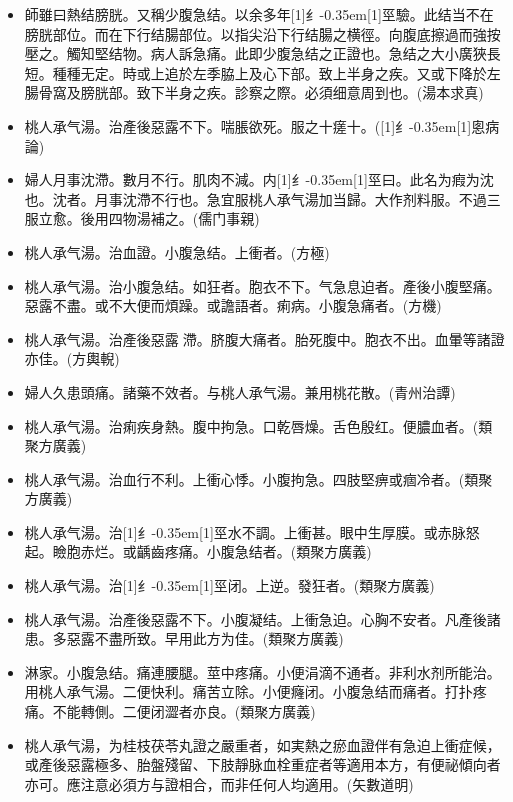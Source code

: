 \documentclass[oneside,b4paper]{ctexbook}
\begin{document}
\begin{flushleft}
\begin{itemize}
\item 師雖曰熱结膀胱。又稱少腹急结。以余多年{\hbox{\scalebox{0.68}[1]{纟}\kern-0.35em\scalebox{0.64}[1]{巠}}}驗。此结当不在膀胱部位。而在下行结腸部位。以指尖沿下行结腸之横徑。向腹底擦過而強按壓之。觸知堅结物。病人訴急痛。此即少腹急结之正證也。急结之大小廣狹長短。種種无定。時或上追於左季脇上及心下部。致上半身之疾。又或下降於左腸骨窩及膀胱部。致下半身之疾。診察之際。必須细意周到也。(湯本求真)
\item 桃人承气湯。治產後惡露不下。喘脹欲死。服之十瘥十。({\hbox{\scalebox{0.65}[1]{纟}\kern-0.35em\scalebox{0.68}[1]{悤}}}病論)
\item 婦人月事沈滯。數月不行。肌肉不減。内{\hbox{\scalebox{0.68}[1]{纟}\kern-0.35em\scalebox{0.64}[1]{巠}}}曰。此名为瘕为沈也。沈者。月事沈滯不行也。急宜服桃人承气湯加当歸。大作剂料服。不過三服立愈。後用四物湯補之。(儒门事親)
\item 桃人承气湯。治血證。小腹急结。上衝者。(方極)
\item 桃人承气湯。治小腹急结。如狂者。胞衣不下。气急息迫者。產後小腹堅痛。惡露不盡。或不大便而煩躁。或譫語者。痢病。小腹急痛者。(方機)
\item 桃人承气湯。治產後惡露{𬈧}滯。脐腹大痛者。胎死腹中。胞衣不出。血暈等諸證亦佳。(方輿輗)
\item 婦人久患頭痛。諸藥不效者。与桃人承气湯。兼用桃花散。(青州治譚)
\item 桃人承气湯。治痢疾身熱。腹中拘急。口乾唇燥。舌色殷红。便膿血者。(類聚方廣義)
\item 桃人承气湯。治血行不利。上衝心悸。小腹拘急。四肢堅痹或痼冷者。(類聚方廣義)
\item 桃人承气湯。治{\hbox{\scalebox{0.68}[1]{纟}\kern-0.35em\scalebox{0.64}[1]{巠}}}水不調。上衝甚。眼中生厚膜。或赤脉怒起。瞼胞赤烂。或齲齒疼痛。小腹急结者。(類聚方廣義)
\item 桃人承气湯。治{\hbox{\scalebox{0.68}[1]{纟}\kern-0.35em\scalebox{0.64}[1]{巠}}}闭。上逆。發狂者。(類聚方廣義)
\item 桃人承气湯。治產後惡露不下。小腹凝结。上衝急迫。心胸不安者。凡產後諸患。多惡露不盡所致。早用此方为佳。(類聚方廣義)
\item 淋家。小腹急结。痛連腰腿。莖中疼痛。小便涓滴不通者。非利水剂所能治。用桃人承气湯。二便快利。痛苦立除。小便癃闭。小腹急结而痛者。打扑疼痛。不能轉側。二便闭澀者亦良。(類聚方廣義)
\item 桃人承气湯，为桂枝茯苓丸證之嚴重者，如実熱之瘀血證伴有急迫上衝症候，或產後惡露極多、胎盤殘留、下肢靜脉血栓重症者等適用本方，有便祕傾向者亦可。應注意必須方与證相合，而非任何人均適用。(矢數道明)
\end{itemize}


\end{flushleft}
\end{document}

